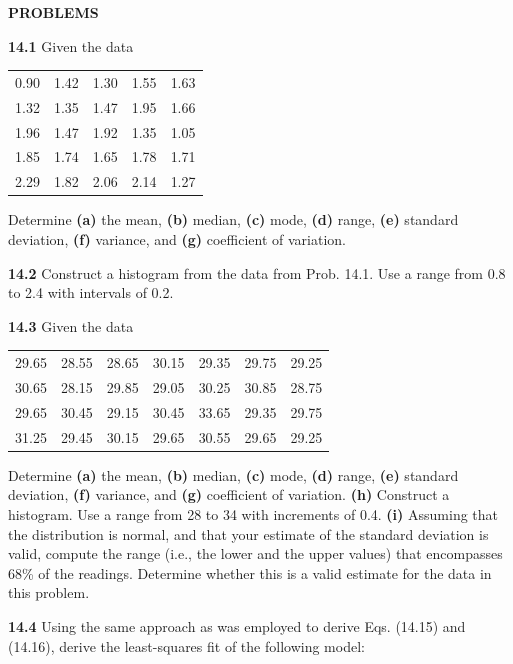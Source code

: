 \documentclass[../main.tex]{subfiles}
\begin{document}
\bigskip
\noindent\textbf{PROBLEMS}\\

\begin{multicols}{2}
    \noindent\textbf{14.1} Given the data

	\noindent \begin{tabular}{ c c c c c }
		0.90 & 1.42 & 1.30 & 1.55 & 1.63 \\
		1.32 & 1.35 & 1.47 & 1.95 & 1.66 \\
		1.96 & 1.47 & 1.92 & 1.35 & 1.05 \\
		1.85 & 1.74 & 1.65 & 1.78 & 1.71 \\
		2.29 & 1.82 & 2.06 & 2.14 & 1.27
	\end{tabular}

	\noindent Determine \textbf{(a)} the mean, \textbf{(b)} median, \textbf{(c)} mode, \textbf{(d)} range,
	\textbf{(e)} standard deviation, \textbf{(f)} variance, and \textbf{(g)} coefficient of
	variation.	


	\noindent\textbf{14.2}  Construct a histogram from the data from Prob. 14.1. Use a range from 0.8 to 2.4 with intervals of 0.2.

	\noindent\textbf{14.3} Given the data

	\noindent \begin{tabular}{c c c c c c c}
		29.65 & 28.55 & 28.65 & 30.15 & 29.35 & 29.75 & 29.25 \\
		30.65 & 28.15 & 29.85 & 29.05 & 30.25 & 30.85 & 28.75 \\
		29.65 & 30.45 & 29.15 & 30.45 & 33.65 & 29.35 & 29.75 \\
		31.25 & 29.45 & 30.15 & 29.65 & 30.55 & 29.65 & 29.25
	\end{tabular}

	\noindent Determine \textbf{(a)} the mean, \textbf{(b)} median, \textbf{(c)} mode, \textbf{(d)} range,
	\textbf{(e)} standard deviation, \textbf{(f)} variance, and \textbf{(g)} coefficient of
	variation.
	\textbf{(h)} Construct a histogram. Use a range from 28 to 34 with
	increments of 0.4.
	\textbf{(i)} Assuming that the distribution is normal, and that your
	estimate of the standard deviation is valid, compute the
	range (i.e., the lower and the upper values) that encompasses 68\% of the readings. Determine whether this is a
	valid estimate for the data in this problem.

	\noindent\textbf{14.4} Using the same approach as was employed to derive
	Eqs. (14.15) and (14.16), derive the least-squares fit of the
	following model:


\end{multicols}
\end{document}
